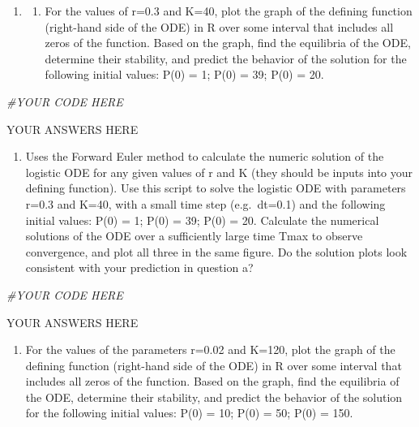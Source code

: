 \documentclass[
]{book}
\newenvironment{Shaded}{\begin{snugshade}}{\end{snugshade}}
\newcommand{\CommentTok}[1]{\textcolor[rgb]{0.56,0.35,0.01}{\textit{#1}}}
\providecommand{\tightlist}{%
  \setlength{\itemsep}{0pt}\setlength{\parskip}{0pt}}
\theoremstyle{definition}
\theoremstyle{definition}
\theoremstyle{definition}
\theoremstyle{remark}
\begin{document}
\begin{enumerate}
\def\labelenumi{\arabic{enumi}.}
\item
  \begin{enumerate}
  \def\labelenumii{\alph{enumii})}
  \tightlist
  \item
    For the values of r=0.3 and K=40, plot the graph of the defining function (right-hand side of the ODE) in R over some interval that includes all zeros of the function. Based on the graph, find the equilibria of the ODE, determine their stability, and predict the behavior of the solution for the following initial values: P(0) = 1; P(0) = 39; P(0) = 20.
  \end{enumerate}
\end{enumerate}

\begin{Shaded}
\begin{Highlighting}[]
\CommentTok{\#YOUR CODE HERE}
\end{Highlighting}
\end{Shaded}

YOUR ANSWERS HERE

\begin{enumerate}
\def\labelenumi{\alph{enumi})}
\setcounter{enumi}{1}
\tightlist
\item
  Uses the Forward Euler method to calculate the numeric solution of the logistic ODE for any given values of r and K (they should be inputs into your defining function). Use this script to solve the logistic ODE with parameters r=0.3 and K=40, with a small time step (e.g.~dt=0.1) and the following initial values: P(0) = 1; P(0) = 39; P(0) = 20. Calculate the numerical solutions of the ODE over a sufficiently large time Tmax to observe convergence, and plot all three in the same figure. Do the solution plots look consistent with your prediction in question a?
\end{enumerate}

\begin{Shaded}
\begin{Highlighting}[]
\CommentTok{\#YOUR CODE HERE}
\end{Highlighting}
\end{Shaded}

YOUR ANSWERS HERE

\begin{enumerate}
\def\labelenumi{\arabic{enumi}.}
\setcounter{enumi}{1}
\tightlist
\item
  For the values of the parameters r=0.02 and K=120, plot the graph of the defining function (right-hand side of the ODE) in R over some interval that includes all zeros of the function. Based on the graph, find the equilibria of the ODE, determine their stability, and predict the behavior of the solution for the following initial values: P(0) = 10; P(0) = 50; P(0) = 150.
\end{enumerate}
\end{document}
